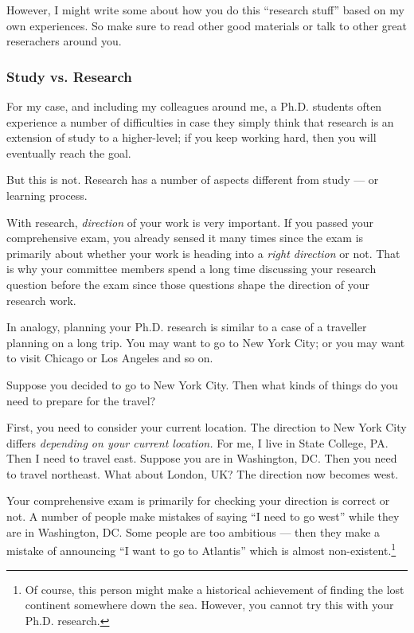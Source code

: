 \documentclass[11pt]{article}
\begin{document}
However, I might write some about how you do this ``research stuff'' based on
my own experiences. So make sure to read other good materials or talk to other
great reserachers around you.

\subsubsection{Study vs. Research}

For my case, and including my colleagues around me, a Ph.D. students often
experience a number of difficulties in case they simply think that research is
an extension of study to a higher-level; if you keep working hard, then you
will eventually reach the goal.

But this is not. Research has a number of aspects different from study --- or
learning process.

With research, \emph{direction} of your work is very important. If you passed
your comprehensive exam, you already sensed it many times since the exam is
primarily about whether your work is heading into a \emph{right direction} or
not. That is why your committee members spend a long time discussing your
research question before the exam since those questions shape the direction of
your research work. 

In analogy, planning your Ph.D. research is similar to a case of a traveller
planning on a long trip. You may want to go to New York City; or you may want
to visit Chicago or Los Angeles and so on. 

Suppose you decided to go to New York City. Then what kinds of things do you
need to prepare for the travel?

First, you need to consider your current location. The direction to New York
City differs \emph{depending on your current location.} For me, I live in
State College, PA. Then I need to travel east. Suppose you are in Washington,
DC. Then you need to travel northeast. What about London, UK? The direction
now becomes west.

Your comprehensive exam is primarily for checking your direction is correct or
not. A number of people make mistakes of saying ``I need to go west'' while
they are in Washington, DC. Some people are too ambitious --- then they make a
mistake of announcing ``I want to go to Atlantis'' which is almost
non-existent.\footnote{Of course, this person might make a historical
achievement of finding the lost continent somewhere down the sea. However, you
cannot try this with your Ph.D. research.}
\end{document}
